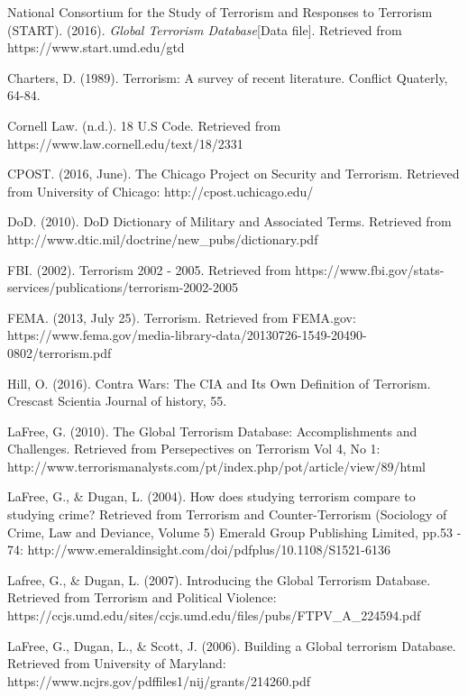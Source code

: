 \documentclass[10pt,a4paper]{article}
\begin{document}
\pagebreak
\begin{thebibliography}{9}

National Consortium for the Study of Terrorism and Responses to Terrorism (START). 
(2016). \textit{Global Terrorism Database}[Data file].
Retrieved from https://www.start.umd.edu/gtd

Charters, D. (1989). Terrorism: A survey of recent literature. Conflict Quaterly, 64-84.

Cornell Law. (n.d.). 18 U.S Code. Retrieved from https://www.law.cornell.edu/text/18/2331

CPOST. (2016, June). The Chicago Project on Security and Terrorism. 
Retrieved from University of Chicago: http://cpost.uchicago.edu/

DoD. (2010). DoD Dictionary of Military and Associated Terms. 
Retrieved from http://www.dtic.mil/doctrine/new\_pubs/dictionary.pdf

FBI. (2002). Terrorism 2002 - 2005. 
Retrieved from https://www.fbi.gov/stats-services/publications/terrorism-2002-2005

FEMA. (2013, July 25). Terrorism. 
Retrieved from FEMA.gov: https://www.fema.gov/media-library-data/20130726-1549-20490-0802/terrorism.pdf

Hill, O. (2016). Contra Wars: The CIA and Its Own Definition of Terrorism. Crescast Scientia Journal of history, 55.

LaFree, G. (2010). The Global Terrorism Database: Accomplishments and Challenges. 
Retrieved from Persepectives on Terrorism Vol 4, No 1: http://www.terrorismanalysts.com/pt/index.php/pot/article/view/89/html

LaFree, G., \& Dugan, L. (2004). How does studying terrorism compare to studying crime? 
Retrieved from Terrorism and Counter-Terrorism (Sociology of Crime, Law and Deviance, Volume 5) Emerald Group Publishing Limited, pp.53 - 74: http://www.emeraldinsight.com/doi/pdfplus/10.1108/S1521-6136%

Lafree, G., \& Dugan, L. (2007). Introducing the Global Terrorism Database. 
Retrieved from Terrorism and Political Violence: https://ccjs.umd.edu/sites/ccjs.umd.edu/files/pubs/FTPV\_A\_224594.pdf

LaFree, G., Dugan, L., \& Scott, J. (2006). Building a Global terrorism Database. 
Retrieved from University of Maryland: https://www.ncjrs.gov/pdffiles1/nij/grants/214260.pdf


\end{thebibliography}
\end{document}
